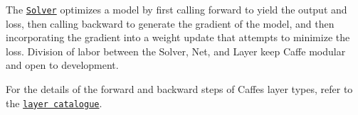 The \href{solver.html}{\tt Solver} optimizes a model by first calling forward to yield the output and loss, then calling backward to generate the gradient of the model, and then incorporating the gradient into a weight update that attempts to minimize the loss. Division of labor between the Solver, Net, and Layer keep Caffe modular and open to development.

For the details of the forward and backward steps of Caffe\textquotesingle{}s layer types, refer to the \href{layers.html}{\tt layer catalogue}. 
